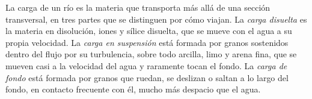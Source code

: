 \begin{definition}\label{def:b1:erosion-transport:load}
La carga de un río es la materia que transporta más allá de una sección transversal, en tres partes que se distinguen por cómo viajan. La
\emph{carga disuelta} es la materia en disolución, iones y sílice disuelta, que se mueve con el agua a su propia velocidad.
La \emph{carga en suspensión} está formada por granos sostenidos dentro del flujo por su turbulencia, sobre todo arcilla,
limo y arena fina, que se mueven casi a la velocidad del agua y raramente tocan el fondo. La \emph{carga de fondo} está formada
por granos que ruedan, se deslizan o saltan a lo largo del fondo, en contacto frecuente con él, mucho más despacio que el agua.
\end{definition}


